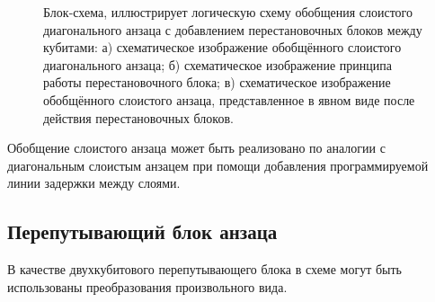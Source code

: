 \documentclass[14pt]{extarticle}
\begin{document}
\begin{figure}[H]
\begin{minipage}[h]{0.18\linewidth}
\end{minipage}
\vfill
\begin{minipage}[h]{1.\linewidth}
\end{minipage}
\caption{Блок-схема, иллюстрирует логическую схему обобщения слоистого диагонального анзаца с добавлением перестановочных блоков между кубитами: а) схематическое изображение обобщённого слоистого диагонального анзаца; б) схематическое изображение принципа работы перестановочного блока; в) схематическое изображение обобщённого слоистого анзаца, представленное в явном виде после действия перестановочных блоков.}\label{fig:layered_ansatz_permut}
\end{figure}

\qquad Обобщение слоистого анзаца может быть реализовано по аналогии с диагональным слоистым анзацем при помощи добавления программируемой линии задержки между слоями.


\subsection{Перепутывающий блок анзаца}

\qquad В качестве двухкубитового перепутывающего блока в схеме могут быть использованы преобразования произвольного вида.
\end{document}
